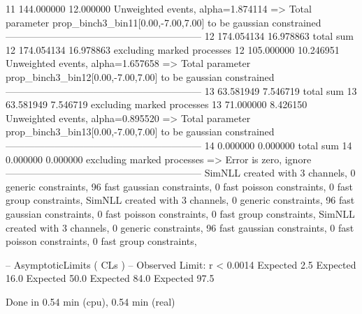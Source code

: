 11         144.000000      12.000000       Unweighted events, alpha=1.874114
  => Total parameter prop_binch3_bin11[0.00,-7.00,7.00] to be gaussian constrained
------------------------------------------------------------
12         174.054134      16.978863       total sum                     
12         174.054134      16.978863       excluding marked processes    
12         105.000000      10.246951       Unweighted events, alpha=1.657658
  => Total parameter prop_binch3_bin12[0.00,-7.00,7.00] to be gaussian constrained
------------------------------------------------------------
13         63.581949       7.546719        total sum                     
13         63.581949       7.546719        excluding marked processes    
13         71.000000       8.426150        Unweighted events, alpha=0.895520
  => Total parameter prop_binch3_bin13[0.00,-7.00,7.00] to be gaussian constrained
------------------------------------------------------------
14         0.000000        0.000000        total sum                     
14         0.000000        0.000000        excluding marked processes    
  => Error is zero, ignore      
------------------------------------------------------------
SimNLL created with 3 channels, 0 generic constraints, 96 fast gaussian constraints, 0 fast poisson constraints, 0 fast group constraints, 
SimNLL created with 3 channels, 0 generic constraints, 96 fast gaussian constraints, 0 fast poisson constraints, 0 fast group constraints, 
SimNLL created with 3 channels, 0 generic constraints, 96 fast gaussian constraints, 0 fast poisson constraints, 0 fast group constraints, 

 -- AsymptoticLimits ( CLs ) --
Observed Limit: r < 0.0014
Expected  2.5%
Expected 16.0%
Expected 50.0%
Expected 84.0%
Expected 97.5%

Done in 0.54 min (cpu), 0.54 min (real)
